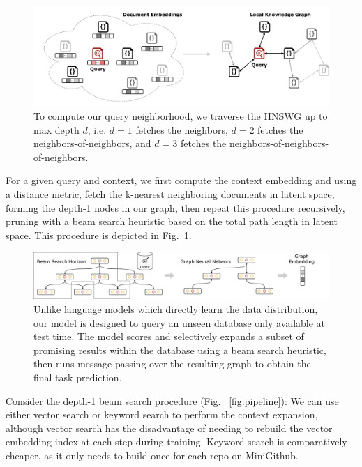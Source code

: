 \documentclass[11pt]{article}
\begin{document}
\begin{figure}[H]
  \centering
  \includegraphics[width=\textwidth]{latent_kg}
  \caption{To compute our query neighborhood, we traverse the HNSWG up to max depth $d$, i.e. $d=1$ fetches the neighbors, $d=2$ fetches the neighbors-of-neighbors, and $d=3$ fetches the neighbors-of-neighbors-of-neighbors.}
  \label{fig:de2kg}
\end{figure}

For a given query and context, we first compute the context embedding and using a distance metric, fetch the k-nearest neighboring documents in latent space, forming the depth-1 nodes in our graph, then repeat this procedure recursively, pruning with a beam search heuristic based on the total path length in latent space. This procedure is depicted in Fig.~\ref{fig:de2kg}.

\begin{figure}[H]
  \centering
  \includegraphics[width=1.05\textwidth]{architecture}
  \caption{Unlike language models which directly learn the data distribution, our model is designed to query an unseen database only available at test time. The model scores and selectively expands a subset of promising results within the database using a beam search heuristic, then runs message passing over the resulting graph to obtain the final task prediction.}
  \label{fig:architecture}
\end{figure}

Consider the depth-1 beam search procedure (Fig. ~\ref{fig:pipeline}): We can use either vector search or keyword search to perform the context expansion, although vector search has the disadvantage of needing to rebuild the vector embedding index at each step during training. Keyword search is comparatively cheaper, as it only needs to build once for each repo on MiniGithub.
\end{document}
